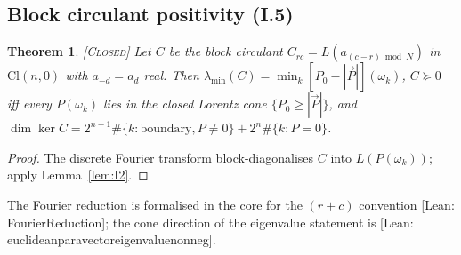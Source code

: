 \documentclass[11pt]{amsart}
\theoremstyle{plain}
\newtheorem{theorem}{Theorem}[section]
\theoremstyle{definition}
\newcommand{\Cl}{\mathrm{Cl}}
\newcommand{\status}[1]{\textsc{[#1]}}
\newcommand{\leanus}{\textunderscore\allowbreak}
\newcommand{\lean}[1]{{\ttfamily\let\_\leanus #1}}
\begin{document}
\subsection{Block circulant positivity (I.5)}
\begin{theorem}\status{Closed}
Let $C$ be the block circulant $C_{rc}=L(a_{(c-r)\bmod N})$ in $\Cl(n,0)$ with
$a_{-d}=a_d$ real. Then $\lambda_{\min}(C)=\min_k[P_0-|\vec P|](\omega_k)$,
$C\succeq0$ iff every $P(\omega_k)$ lies in the closed Lorentz cone
$\{P_0\ge|\vec P|\}$, and $\dim\ker C=2^{n-1}\#\{k:\text{boundary},P\ne0\}+2^n\#\{k:P=0\}$.
\end{theorem}
\begin{proof}
The discrete Fourier transform block-diagonalises $C$ into $L(P(\omega_k))$;
apply Lemma~\ref{lem:I2}.
\end{proof}
\noindent The Fourier reduction is formalised in the core for the $(r+c)$
convention \lean{[Lean: FourierReduction]}; the cone direction of the
eigenvalue statement is
\lean{[Lean: euclidean\_paravector\_eigenvalue\_nonneg]}.
\end{document}
